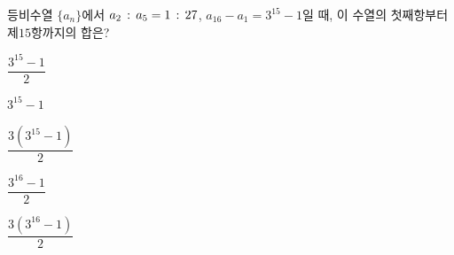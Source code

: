 등비수열 $\{a_n\}$에서 $a_2\mkern3mu :\mkern3mu a_5=1\mkern3mu :\mkern3mu 27$, $a_{16}-a_1=3^{15}-1$일 때, 이 수열의 첫째항부터 제$15$항까지의 합은?
\begin{choices32}{\rule[-3ex]{0pt}{8ex}$\dfrac{3^{15}-1}{2}$}{\rule[-3ex]{0pt}{8ex}$3^{15}-1$}{\rule[-3ex]{0pt}{8ex}$\dfrac{3(3^{15}-1)}{2}$}{\rule[-3ex]{0pt}{8ex}$\dfrac{3^{16}-1}{2}$}{\rule[-3ex]{0pt}{8ex}$\dfrac{3(3^{16}-1)}{2}$}\end{choices32}
